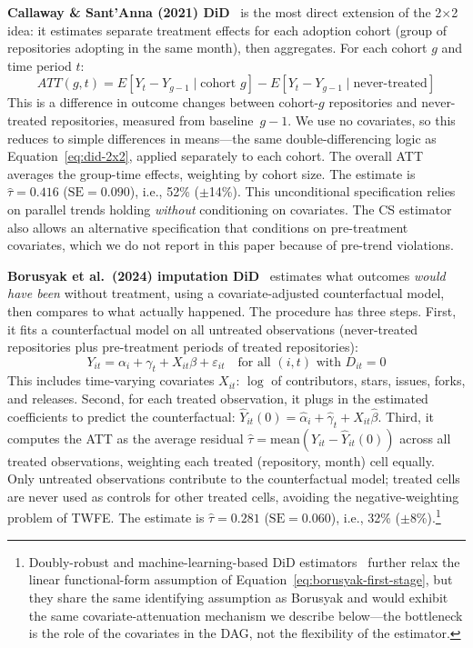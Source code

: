 \textbf{Callaway \& Sant'Anna (2021) DiD}~\cite{callaway2021difference} is the most direct extension of the 2$\times$2 idea: it estimates separate treatment effects for each adoption cohort (group of repositories adopting in the same month), then aggregates.
For each cohort $g$ and time period $t$:
\begin{equation}
\label{eq:cs-att-gt}
ATT(g, t) = E[Y_t - Y_{g-1} \mid \text{cohort } g] - E[Y_t - Y_{g-1} \mid \text{never-treated}]
\end{equation}
This is a difference in outcome changes between cohort-$g$ repositories and never-treated repositories, measured from baseline~$g\!-\!1$.
We use no covariates, so this reduces to simple differences in means---the same double-differencing logic as Equation~\ref{eq:did-2x2}, applied separately to each cohort.
The overall ATT averages the group-time effects, weighting by cohort size.
The estimate is $\hat{\tau} = 0.416$ ($\text{SE} = 0.090$), i.e., 52\% ($\pm$14\%).
This unconditional specification relies on parallel trends holding \emph{without} conditioning on covariates.
The CS estimator also allows an alternative specification that conditions on pre-treatment covariates, which we do not report in this paper because of pre-trend violations.

\textbf{Borusyak et al.\ (2024) imputation DiD}~\cite{borusyak2024revisiting} estimates what outcomes \emph{would have been} without treatment, using a covariate-adjusted counterfactual model, then compares to what actually happened.
The procedure has three steps.
First, it fits a counterfactual model on all untreated observations (never-treated repositories plus pre-treatment periods of treated repositories):
\begin{equation}
\label{eq:borusyak-first-stage}
Y_{it} = \alpha_i + \gamma_t + X_{it}\beta + \varepsilon_{it} \quad \text{for all } (i,t) \text{ with } D_{it} = 0
\end{equation}
This includes time-varying covariates $X_{it}$: $\log$ of contributors, stars, issues, forks, and releases.
Second, for each treated observation, it plugs in the estimated coefficients to predict the counterfactual: $\hat{Y}_{it}(0) = \hat{\alpha}_i + \hat{\gamma}_t + X_{it}\hat{\beta}$.
Third, it computes the ATT as the average residual $\hat{\tau} = \text{mean}(Y_{it} - \hat{Y}_{it}(0))$ across all treated observations, weighting each treated (repository, month) cell equally.
Only untreated observations contribute to the counterfactual model; treated cells are never used as controls for other treated cells, avoiding the negative-weighting problem of TWFE\@.
The estimate is $\hat{\tau} = 0.281$ ($\text{SE} = 0.060$), i.e., 32\% ($\pm$8\%).\footnote{Doubly-robust and machine-learning-based DiD estimators~\cite{santanna2020doubly, chang2020double} further relax the linear functional-form assumption of Equation~\ref{eq:borusyak-first-stage}, but they share the same identifying assumption as Borusyak and would exhibit the same covariate-attenuation mechanism we describe below---the bottleneck is the role of the covariates in the DAG, not the flexibility of the estimator.}

